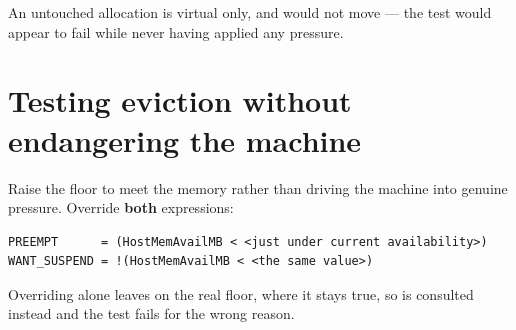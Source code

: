 An untouched allocation is virtual only, and  would not move ---
the test would appear to fail while never having applied any pressure.

\section{Testing eviction without endangering the machine}

Raise the floor to meet the memory rather than driving the machine into genuine
pressure. Override \textbf{both} expressions:

\begin{lstlisting}
PREEMPT      = (HostMemAvailMB < <just under current availability>)
WANT_SUSPEND = !(HostMemAvailMB < <the same value>)
\end{lstlisting}

Overriding  alone leaves  on the real floor, where
it stays true, so  is consulted instead and the test fails for the
wrong reason.
